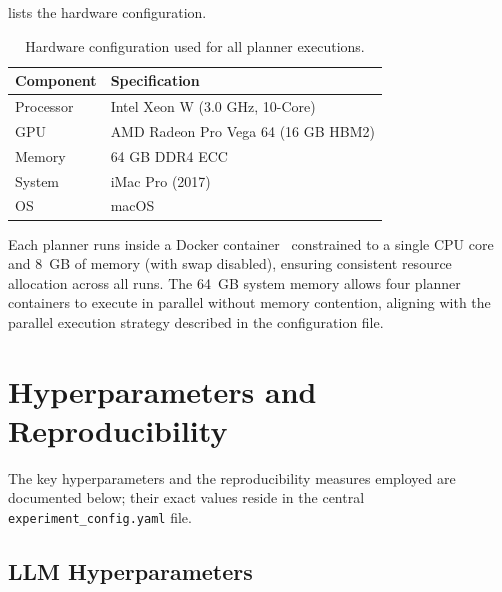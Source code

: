  lists the hardware configuration.

\begin{table}[htbp]
  \centering
  \caption{Hardware configuration used for all planner executions.}
  \label{tab:hardware}
  \small
  \begin{tabular}{l l}
    \toprule
    \textbf{Component} & \textbf{Specification} \\
    \midrule
    Processor & Intel Xeon W (3.0 GHz, 10-Core) \\
    GPU       & AMD Radeon Pro Vega 64 (16 GB HBM2) \\
    Memory    & 64 GB DDR4 ECC \\
    System    & iMac Pro (2017) \\
    OS        & macOS \\
    \bottomrule
  \end{tabular}
\end{table}

Each planner runs inside a Docker container~\cite{Merkel2014} constrained to a single CPU core and 8~GB of memory (with swap disabled), ensuring consistent resource allocation across all runs.
The 64~GB system memory allows four planner containers to execute in parallel without memory contention, aligning with the parallel execution strategy described in the configuration file.


\section{Hyperparameters and Reproducibility}
\label{sec:setup:hyperparameters}

The key hyperparameters and the reproducibility measures employed are documented below; their exact values reside in the central \texttt{experiment\_config.yaml} file.

\subsection{LLM Hyperparameters}

